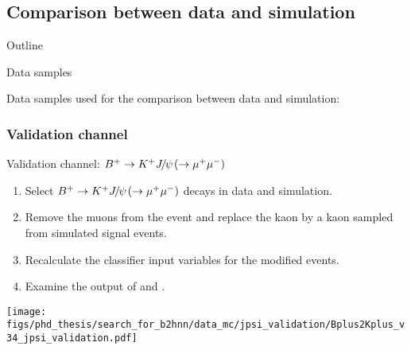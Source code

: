 \subsection{Comparison between data and simulation}
\begin{frame}[noframenumbering]{Outline}
 \tableofcontents[currentsection, currentsubsection, subsubsectionstyle=show]
\end{frame}
\begin{frame}{Data samples}
\bi
\item Data samples used for the comparison between data and simulation:
\bi
{} 
\ei
\ei
\end{frame}
\subsubsection{Validation channel}
\begin{frame}{Validation channel: $B^+\rightarrow K^+{J\mskip -3mu/\mskip -2mu\psi\mskip 2mu}(\rightarrow\mu^+\mu^-)$}
\begin{enumerate}
\item Select $B^+\rightarrow K^+{J\mskip -3mu/\mskip -2mu\psi\mskip 2mu}(\rightarrow\mu^+\mu^-)$ decays in data and simulation.
\item Remove the muons from the event and replace the kaon by a kaon sampled from simulated signal events.
\item Recalculate the classifier input variables for the modified events.
\item Examine the output of \bdto and \bdtt.
\end{enumerate}
\vspace{0.25cm}
\centering
\texttt{[image: figs/phd\_thesis/search\_for\_b2hnn/data\_mc/jpsi\_validation/Bplus2Kplus\_v34\_jpsi\_validation.pdf]}
\end{frame}

